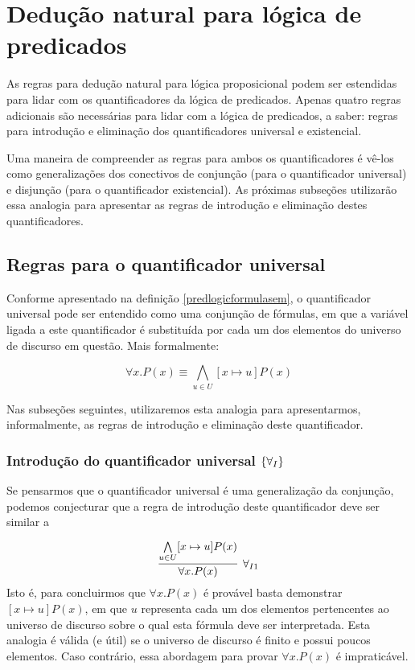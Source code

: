 \section{Dedução natural para lógica de predicados}

As regras para dedução natural para lógica proposicional podem ser
estendidas para lidar com os quantificadores da lógica de predicados.
Apenas quatro regras adicionais são necessárias para lidar com a
lógica de predicados, a saber: regras para introdução e eliminação dos
quantificadores universal e existencial.

Uma maneira de compreender as regras para ambos os quantificadores é
vê-los como generalizações dos conectivos de conjunção (para o
quantificador universal) e disjunção (para o quantificador
existencial). As próximas subseções utilizarão essa analogia para
apresentar as regras de introdução e eliminação destes
quantificadores.

\subsection{Regras para o quantificador universal}

Conforme apresentado na definição \ref{predlogicformulasem}, o
quantificador universal pode ser entendido como uma conjunção de
fórmulas, em que a variável ligada a este quantificador é substituída
por cada um dos elementos do universo de discurso em questão. Mais
formalmente:

\[\forall x. P(x) \equiv \bigwedge\limits_{u\in U}[x\mapsto u]P(x)\]

Nas subseções seguintes, utilizaremos esta analogia para
apresentarmos, informalmente, as regras de introdução e eliminação
deste quantificador.


\subsubsection{Introdução do quantificador universal $\scriptsize{\{\forall_I}\}$}

Se pensarmos que o quantificador universal é uma generalização da
conjunção, podemos conjecturar que a regra de introdução deste
quantificador deve ser similar a

\[
\infer[\forall_{I1}] {\forall x.P(x)}
                           {\bigwedge\limits_{u\in U}[x\mapsto u] P(x)}
\]
Isto é, para concluirmos que $\forall x.P(x)$ é provável basta
demonstrar $[x\mapsto u]P(x)$, em que $u$ representa cada um dos
elementos pertencentes ao universo de discurso sobre o qual esta
fórmula deve ser interpretada. Esta analogia é válida (e útil) se o
universo de discurso é finito e possui poucos elementos. Caso
contrário, essa abordagem para provar $\forall x. P(x)$ é
impraticável.

